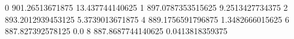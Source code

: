 0 901.26513671875 13.437744140625
1 897.0787353515625 9.2513427734375
2 893.2012939453125 5.3739013671875
4 889.1756591796875 1.3482666015625
6 887.827392578125 0.0
8 887.8687744140625 0.0413818359375

